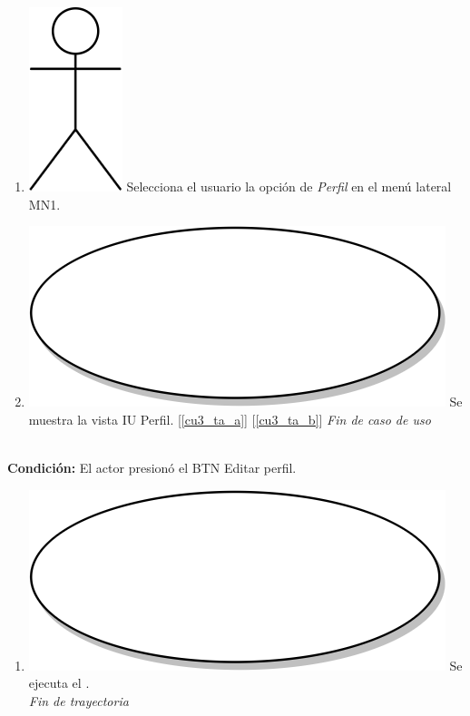 \begin{enumerate}
\item {\includegraphics[scale=.1]{Capitulo3/img/actor.png} Selecciona el usuario la opción de \textit{Perfil} en el menú lateral MN1.}
\item {\includegraphics[scale=.05]{Capitulo3/img/proceso.png} Se muestra la vista IU Perfil. [\ref{cu3_ta_a}] [\ref{cu3_ta_b}]}
  \textit{Fin de caso de uso} \\  
\end{enumerate}

\textbf{} \\
\textbf{Condición:} El actor presionó el BTN Editar perfil. \\
 \begin{enumerate}[label=A\arabic*]
    \item {\includegraphics[scale=.05]{Capitulo3/img/proceso.png} Se ejecuta el \textbf{}.} \\
    \textit{Fin de trayectoria} \\
\end{enumerate}

